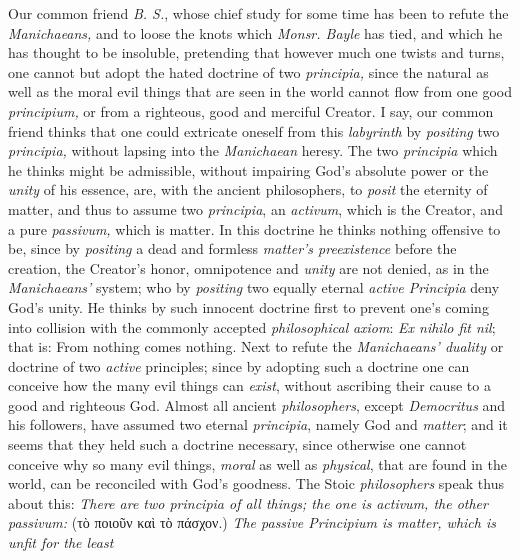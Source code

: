 \documentclass[12pt,a4paper,openany]{book}
\newcommand{\opage}[1]{\marginnote{\footnotesize\textit{[#1]}}}
\begin{document}
Our common friend \textit{B. S.}, whose chief study for some time has been to refute the
\textit{Manichaeans,} and to loose the knots which \textit{Monsr. Bayle} has tied,
and which he has thought to be insoluble, pretending that however much one
twists
\setcounter{footnote}{0}%
\opage{13}and turns, one cannot but adopt the hated doctrine of two
\textit{principia,} since the natural as well as the moral evil things that are
seen in the world cannot flow from one good \textit{principium,} or from a
righteous, good and merciful Creator. I say, our common friend thinks that one
could extricate oneself from this \textit{labyrinth} by \textit{positing} two
\textit{principia,} without lapsing into the \textit{Manichaean} heresy. The two
\textit{principia} which he thinks might be admissible, without impairing God's
absolute power or the \textit{unity} of his essence, are, with the ancient
philosophers, to \textit{posit} the eternity of matter, and thus to assume two
\textit{principia}, an \textit{activum}, which is the Creator, and a pure
\textit{passivum,} which is matter. In this doctrine he thinks nothing offensive
to be, since by \textit{positing} a dead and formless \textit{matter's
preexistence} before the creation, the Creator's honor, omnipotence and
\textit{unity} are not denied, as in the \textit{Manichaeans'} system; who by
\textit{positing} two equally eternal \textit{active Principia} deny God's unity.
He thinks by such innocent doctrine first to prevent one's coming into collision
with the commonly accepted \textit{philosophical} \textit{axiom}: \textit{Ex nihilo
fit nil}; that is: From nothing comes nothing. Next to refute the
\textit{Manichaeans' duality} or doctrine of two \textit{active} principles;
since by adopting such a doctrine one can conceive how the many evil things can
\textit{exist}, without ascribing their cause to a good and righteous God.
Almost all ancient \textit{philosophers}, except \textit{Democritus} and his
followers, have assumed two eternal \textit{principia}, namely God and
\textit{matter}; and it seems that they held such a doctrine necessary, since
otherwise one cannot conceive why so many evil things, \textit{moral} as well as
\textit{physical}, that are found in the world, can be reconciled with God's
goodness. The Stoic \textit{philosophers} speak thus about this: \emph{There are
two \textit{principia} of all things; the one is \textit{activum,} the other
\textit{passivum:}} (τὸ ποιοῦν καὶ τὸ πάσχον.) \emph{The \textit{passive
Principium} is \textit{matter}, which is unfit for the least}
\end{document}
